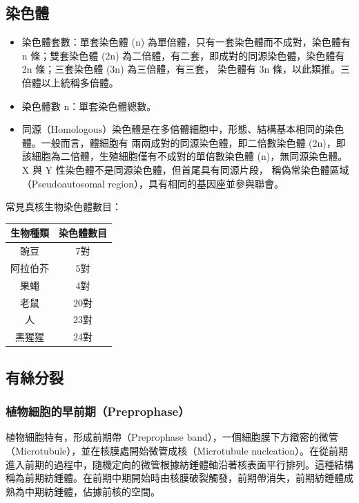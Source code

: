 \documentclass[a4paper,12pt]{report}
\begin{document}
\subsection{染色體}
\begin{itemize}
  \item 染色體套數：單套染色體 (n) 為單倍體，只有一套染色體而不成對，染色體有 n 條；雙套染色體 (2n) 為二倍體，有二套，即成對的同源染色體，染色體有 2n 條；三套染色體 (3n) 為三倍體，有三套， 染色體有 3n 條，以此類推。三倍體以上統稱多倍體。
  \item 染色體數 n：單套染色體總數。
  \item 同源（Homologous）染色體是在多倍體細胞中，形態、結構基本相同的染色體。一般而言，體細胞有 兩兩成對的同源染色體，即二倍數染色體 (2n)，即該細胞為二倍體，生殖細胞僅有不成對的單倍數染色體 (n)，無同源染色體。X 與 Y 性染色體不是同源染色體，但首尾具有同源片段， 稱偽常染色體區域（Pseudoautosomal region），具有相同的基因座並參與聯會。
\end{itemize}
常見真核生物染色體數目：
\begin{longtable}[c]{|c|c|}
\hline
生物種類 & 染色體數目 \\ \hline
豌豆 & 7對 \\ \hline
阿拉伯芥 & 5對 \\ \hline
果蠅 & 4對 \\ \hline
老鼠 & 20對 \\ \hline
人 & 23對 \\ \hline
黑猩猩 & 24對 \\ \hline
\end{longtable}
\subsection{有絲分裂}
\subsubsection{植物細胞的早前期（Preprophase）}
植物細胞特有，形成前期帶（Preprophase band），一個細胞膜下方緻密的微管（Microtubule），並在核膜處開始微管成核（Microtubule nucleation）。在從前期進入前期的過程中，隨機定向的微管根據紡錘體軸沿著核表面平行排列。這種結構稱為前期紡錘體。在前期中期開始時由核膜破裂觸發，前期帶消失，前期紡錘體成熟為中期紡錘體，佔據前核的空間。
\end{document}
